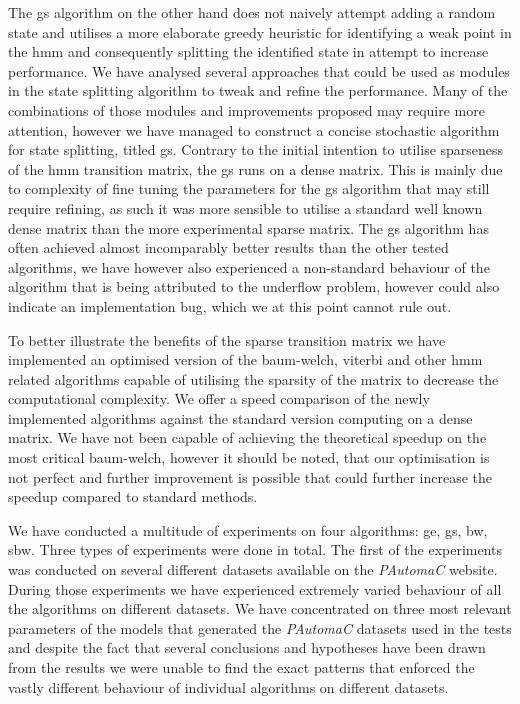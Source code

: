 The \acrlong{gs} algorithm on the other hand does not naively attempt adding a random state and utilises a more elaborate greedy heuristic for identifying a weak point in the \gls{hmm} and consequently splitting the identified state in attempt to increase performance. We have analysed several approaches that could be used as modules in the state splitting algorithm to tweak and refine the performance. Many of the combinations of those modules and improvements proposed may require more attention, however we have managed to construct a concise stochastic algorithm for state splitting, titled \acrlong{gs}. Contrary to the initial intention to utilise sparseness of the \gls{hmm} transition matrix, the \gls{gs} runs on a dense matrix. This is mainly due to complexity of fine tuning the parameters for the \gls{gs} algorithm that may still require refining, as such it was more sensible to utilise a standard well known dense matrix than the more experimental sparse matrix. The \gls{gs} algorithm has often achieved almost incomparably better results than the other tested algorithms, we have however also experienced a non-standard behaviour of the algorithm that is being attributed to the underflow problem, however could also indicate an implementation bug, which we at this point cannot rule out.

To better illustrate the benefits of the sparse transition matrix we have implemented an optimised version of the \gls{baum-welch}, \gls{viterbi} and other \gls{hmm} related algorithms capable of utilising the sparsity of the matrix to decrease the computational complexity. We offer a speed comparison of the newly implemented algorithms against the standard version computing on a dense matrix. We have not been capable of achieving the theoretical speedup on the most critical \gls{baum-welch}, however it should be noted, that our optimisation is not perfect and further improvement is possible that could further increase the speedup compared to standard methods.

We have conducted a multitude of experiments on four algorithms: \acrlong{ge}, \acrlong{gs}, \acrlong{bw}, \acrlong{sbw}. Three types of experiments were done in total. The first of the experiments was conducted on several different datasets available on the \emph{PAutomaC} website. During those experiments we have experienced extremely varied behaviour of all the algorithms on different datasets. We have concentrated on three most relevant parameters of the models that generated the \emph{PAutomaC} datasets used in the tests and despite the fact that several conclusions and hypotheses have been drawn from the results we were unable to find the exact patterns that enforced the vastly different behaviour of individual algorithms on different datasets.


